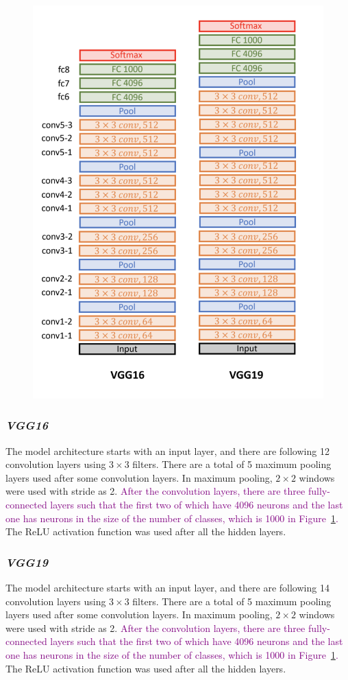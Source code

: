 \begin{figure}[h]
    \centering
    \includegraphics[width=.6\linewidth]{fig/vgg16_vgg19_archs.png}
    \label{fig:vgg16_vgg19_archs}
\end{figure}

\subsubsection*{\textit{VGG16}}

The model architecture starts with an input layer, and there are following 12 convolution layers using $3 \times 3$ filters. There are a total of 5 maximum pooling layers used after some convolution layers. In maximum pooling, $2 \times 2$ windows were used with stride as 2. \textcolor{purple}{After the convolution layers, there are three fully-connected layers such that the first two of which have 4096 neurons and the last one has neurons in the size of the number of classes, which is 1000 in Figure~\ref{fig:vgg16_vgg19_archs}.} The ReLU activation function was used after all the hidden layers.

\subsubsection*{\textit{VGG19}}

The model architecture starts with an input layer, and there are following 14 convolution layers using $3 \times 3$ filters. There are a total of 5 maximum pooling layers used after some convolution layers. In maximum pooling, $2 \times 2$ windows were used with stride as 2. \textcolor{purple}{After the convolution layers, there are three fully-connected layers such that the first two of which have 4096 neurons and the last one has neurons in the size of the number of classes, which is 1000 in Figure~\ref{fig:vgg16_vgg19_archs}.} The ReLU activation function was used after all the hidden layers.